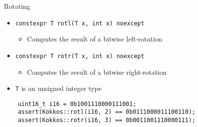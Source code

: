 \begin{frame}[fragile]{Rotating}
	\begin{itemize}
		\item \texttt{constexpr T rotl(T x, int x) noexcept}
		      \begin {itemize}
		\item Computes the result of a bitwise left-rotation
	\end{itemize}
	\item \texttt{constexpr T rotr(T x, int x) noexcept}
	\begin {itemize}
	\item Computes the result of a bitwise right-rotation
	\end{itemize}
	\vfill
	\item \texttt{T} is an unsigned integer type
	\end{itemize}
	\vfill
	\lstset {language=C++}
	\begin{lstlisting}
    uint16_t i16 = 0b1001110000111001;
    assert(Kokkos::rotl(i16, 2) == 0b0111000011100110);
    assert(Kokkos::rotr(i16, 3) == 0b0011001110000111);
	\end{lstlisting}	
\end{frame}


